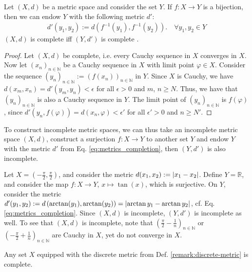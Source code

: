 \begin{theorem}
	Let $(X, d)$ be a metric space and consider the set $Y$. If $f: X\to Y$ is a bijection, then we can endow $Y$ with the following metric $d'$:
	\begin{align}\label{eq:metrics_completion}
		d'(y_1, y_2) := d\left(f^{-1}(y_1), f^{-1}(y_2)\right). \quad \forall y_1, y_2\in Y
	\end{align}
	$(X, d)$ is complete iff $(Y, d')$ is complete \cite{3789234}.
\end{theorem}

\begin{proof}
	Let $(X, d)$ be complete, i.e. every Cauchy sequence in $X$ converges in $X$. Now let $(x_n)_{n\in\mathbb N}$ be a Cauchy sequence in $X$ with limit point $\varphi\in X$. Consider the sequence $(y_n)_{n\in\mathbb N} := \left(f(x_n)\right)_{n\in\mathbb N}$ in $Y$. Since $X$ is Cauchy, we have $ d(x_m, x_n) = d'(y_m, y_n) < \epsilon$ for all $\epsilon > 0$ and $m$, $n\geq N$. Thus, we have that $(y_{n})_{n\in\mathbb N}$ is also a Cauchy sequence in $Y$. The limit point of $\left(y_n\right)_{n\in\mathbb N}$ is $f(\varphi)$, since $d'(y_n, f(\varphi)) = d(x_n, \varphi) < \epsilon'$ for all $\epsilon' > 0$ and $n\geq N'$.
\end{proof}

\begin{remark}
	To construct incomplete metric spaces, we can thus take an incomplete metric space $(X, d)$, construct a surjection $f:X\to Y$ to another set $Y$ and endow $Y$ with the metric $d'$ from Eq. \eqref{eq:metrics_completion}, then $(Y, d')$ is also incomplete.
\end{remark}

\begin{exmp}\label{exmp:r_with_arctan_metric}
	Let $X = \left(-\frac{\pi}{2}, \frac{\pi}{2}\right)$, and consider the metric $d(x_1, x_2) := \left\vert x_1 - x_2 \right\vert$. Define $Y = \mathbb R$, and consider the map $f: X\to Y$, $x\mapsto \tan(x)$, which is surjective. On $Y$, consider the metric $d'(y_1, y_2) := d\left( \arctan(y_1), \arctan(y_2)\right) = \left\vert \arctan y_1 - \arctan y_2 \right\vert$, cf. Eq. \eqref{eq:metrics_completion}. Since $(X, d)$ is incomplete, $(Y, d')$ is incomplete as well. To see that $(X, d)$ is incomplete, note that $\left(\frac{\pi}{2} - \frac{1}{n}\right)_{n\in\mathbb N}$ or $\left( -\frac{\pi}{2} + \frac{1}{n} \right)_{n\in\mathbb N}$ are Cauchy in $X$, yet do not converge in $X$.
\end{exmp}

\begin{exmp}
	Any set $X$ equipped with the discrete metric from Def. \ref{remark:discrete-metric} is complete.
\end{exmp}

